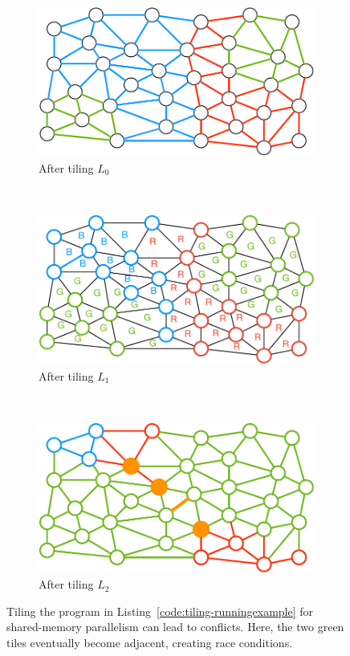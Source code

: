\begin{figure}[h]
\centering
\begin{subfigure}[b]{0.33\textwidth}
\includegraphics[width=\textwidth]{sparsetiling/figures/loop_0_conflicts.pdf}
\caption{After tiling $L_0$}
\label{fig:st-conflicts-a}
\end{subfigure}%
~ 
\begin{subfigure}[b]{0.33\textwidth}
\centering
\includegraphics[width=\textwidth]{sparsetiling/figures/loop_1_conflicts.pdf}
\caption{After tiling $L_1$}
\label{fig:st-conflicts-b}
\end{subfigure}%
~
\begin{subfigure}[b]{0.34\textwidth}
\centering
\includegraphics[width=\textwidth]{sparsetiling/figures/loop_2_conflicts.pdf}
\caption{After tiling $L_2$}
\label{fig:st-conflicts-c}
\end{subfigure}%

\caption{Tiling the program in Listing~\ref{code:tiling-runningexample} for shared-memory parallelism can lead to conflicts. Here, the two green tiles eventually become adjacent, creating race conditions.}
\label{fig:st-conflicts}
\end{figure}

